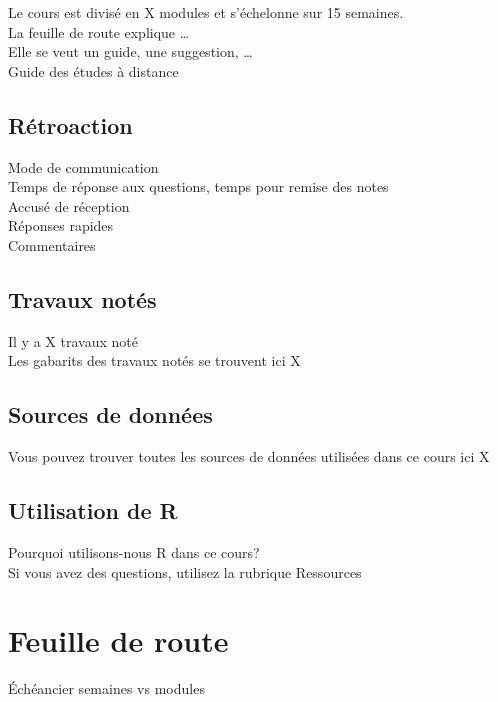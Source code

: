 \documentclass[
  12pt,
]{krantz}
\begin{document}
Le cours est divisé en X modules et s'échelonne sur 15 semaines.\\
La feuille de route explique \ldots{}\\
Elle se veut un guide, une suggestion, \ldots{}\\
Guide des études à distance

\hypertarget{ruxe9troaction}{%
\section*{Rétroaction}\label{ruxe9troaction}}


Mode de communication\\
Temps de réponse aux questions, temps pour remise des notes\\
Accusé de réception\\
Réponses rapides\\
Commentaires

\hypertarget{travaux-notuxe9s}{%
\section*{Travaux notés}\label{travaux-notuxe9s}}


Il y a X travaux noté\\
Les gabarits des travaux notés se trouvent ici X

\hypertarget{sources-de-donnuxe9es}{%
\section*{Sources de données}\label{sources-de-donnuxe9es}}


Vous pouvez trouver toutes les sources de données utilisées dans ce cours ici X

\hypertarget{utilisation-de-r}{%
\section*{Utilisation de R}\label{utilisation-de-r}}


Pourquoi utilisons-nous R dans ce cours?\\
Si vous avez des questions, utilisez la rubrique Ressources

\hypertarget{feuille-de-route}{%
\chapter*{Feuille de route}\label{feuille-de-route}}


Échéancier semaines vs modules
\end{document}
